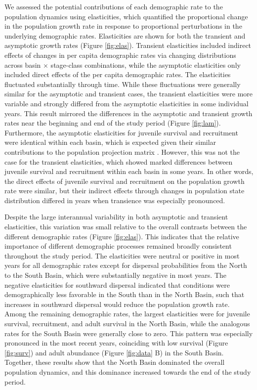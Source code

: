 \documentclass[11pt]{article}
\begin{document}
We assessed the potential contributions of each demographic rate to the population dynamics
using elasticities,
which quantified the proportional change in the population growth rate in 
response to proportional perturbations in the underlying demographic rates.
Elasticities are shown
for both the transient and asymptotic growth rates (Figure \ref{fig:elas}).
Transient elasticities included indirect effects of changes in per capita demographic rates
via changing distributions across basin $\times$ stage-class combinations, 
while the asymptotic elasticities only included direct effects 
of the per capita demographic rates.
The elasticities fluctuated substantially through time.
While these fluctuations were generally similar for the asymptotic and transient cases,
the transient elasticities were more variable and strongly differed 
from the asymptotic elasticities in some individual years.
This result mirrored the differences in the asymptotic and transient growth rates 
near the beginning and end of the study period (Figure \ref{fig:lam}).
Furthermore, the asymptotic elasticities for juvenile survival and recruitment
were identical within each basin, 
which is expected given their similar contributions to the population projection matrix
\citep{caswell2001matrix}.
However, this was not the case for the transient elasticities, which showed marked differences
between juvenile survival and recruitment within each basin in some years. 
In other words, the direct effects of juvenile survival and recruitment on the population growth rate were similar, but their indirect effects 
through changes in population state distribution differed
in years when transience was especially pronounced.

Despite the large interannual variability in both asymptotic and transient elasticities,
this variation was small relative to the overall contrasts 
between the different demographic rates (Figure \ref{fig:elas}). 
This indicates that the relative importance of different demographic processes
remained broadly consistent throughout the study period.
The elasticities were neutral or positive in most years for all demographic rates 
except for dispersal probabilities from the North to the South Basin,
which were substantially negative in most years.
The negative elasticities for southward dispersal indicated that conditions were 
demographically less favorable in the South than in the North Basin,
such that increases in southward dispersal would reduce the population growth rate.
Among the remaining demographic rates,
the largest elasticities were for juvenile survival, recruitment, and adult survival
in the North Basin, while the analogous rates for the South Basin were generally close to zero.
This pattern was especially pronounced in the most recent years,
coinciding with low survival (Figure \ref{fig:surv}) 
and adult abundance (Figure \ref{fig:data} B) in the South Basin.
Together, these results show that the North Basin dominated 
the overall population dynamics, 
and this dominance increased towards the end of the study period.
\end{document}

